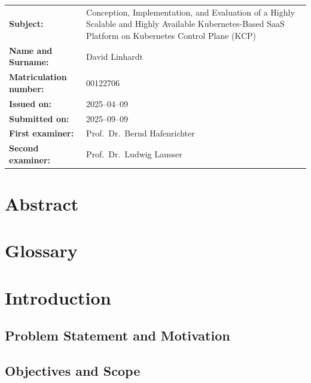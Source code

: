 \documentclass[11pt, a4paper, oneside, draft]{scrartcl}
\newcommand{\thesistitle}{Conception, Implementation, and Evaluation of a Highly Scalable and Highly Available Kubernetes-Based SaaS Platform on Kubernetes Control Plane (KCP)}
\begin{document}
\begin{titlepage}
        \begin{tabularx}{\textwidth}{@{}lX@{}}
            \textbf{Subject:} & \thesistitle\\[2cm]
            \textbf{Name and Surname:} & David Linhardt \\[0.5cm]
            \textbf{Matriculation number:} & 00122706\\[2cm]     
            \textbf{Issued on:} & 2025--04--09 \\[0.5cm]           
            \textbf{Submitted on:} & 2025--09--09 \\[2cm]           
            \textbf{First examiner:} & Prof.\ Dr.\ Bernd Hafenrichter \\[0.5cm]      
            \textbf{Second examiner:} & Prof.\ Dr.\ Ludwig Lausser \\
        \end{tabularx}

    \end{titlepage}

    \restoregeometry


    \section*{Abstract}

    \begingroup
        \tableofcontents
    \endgroup

    \section*{Glossary}


    \section{Introduction}

        \subsection{Problem Statement and Motivation}



        \subsection{Objectives and Scope}
\end{document}
